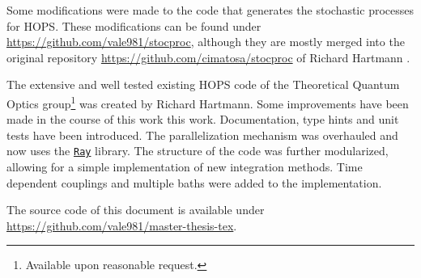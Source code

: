 Some modifications were made to the code that generates the stochastic
processes for HOPS. These modifications can be found under
\url{https://github.com/vale981/stocproc}, although they are mostly
merged into the original repository
\url{https://github.com/cimatosa/stocproc} of Richard Hartmann
.

The extensive and well tested existing HOPS code of the Theoretical
Quantum Optics group\footnote{Available upon reasonable request.} was
created by Richard Hartmann. Some improvements have been made in the
course of this work this work.  Documentation, type hints and unit
tests have been introduced. The parallelization mechanism was
overhauled and now uses the \href{https://www.ray.io}{\texttt{Ray}}
library. The structure of the code was further modularized, allowing
for a simple implementation of new integration methods. Time dependent
couplings and multiple baths were added to the implementation.

The source code of this document is available under
\url{https://github.com/vale981/master-thesis-tex}.
